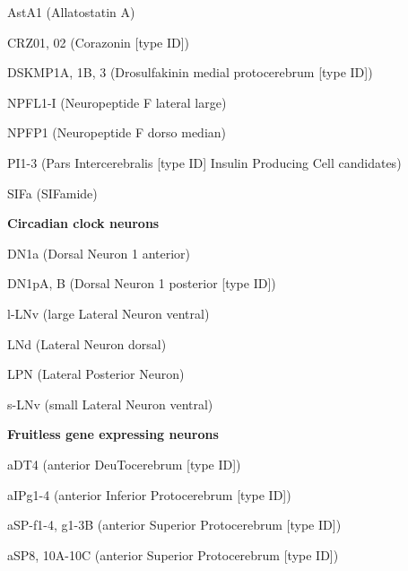 \documentclass{article}
\begin{document}
{\footnotesize
\noindent\hspace*{1.0em}AstA1 (Allatostatin A)\par
\noindent\hspace*{1.0em}CRZ01, 02 (Corazonin [type ID])\par
\noindent\hspace*{1.0em}DSKMP1A, 1B, 3 (Drosulfakinin medial protocerebrum [type ID])\par
\noindent\hspace*{1.0em}NPFL1-I (Neuropeptide F lateral large)\par
\noindent\hspace*{1.0em}NPFP1 (Neuropeptide F dorso median)\par
\noindent\hspace*{1.0em}PI1-3 (Pars Intercerebralis [type ID] Insulin Producing Cell candidates)\par
\noindent\hspace*{1.0em}SIFa (SIFamide)\par
\noindent\textbf{Circadian clock neurons}\par
\noindent\hspace*{1.0em}DN1a (Dorsal Neuron 1 anterior)\par
\noindent\hspace*{1.0em}DN1pA, B (Dorsal Neuron 1 posterior [type ID])\par
\noindent\hspace*{1.0em}l-LNv (large Lateral Neuron ventral)\par
\noindent\hspace*{1.0em}LNd (Lateral Neuron dorsal)\par
\noindent\hspace*{1.0em}LPN (Lateral Posterior Neuron)\par
\noindent\hspace*{1.0em}s-LNv (small Lateral Neuron ventral)\par
\noindent\textbf{Fruitless gene expressing neurons}\par
\noindent\hspace*{1.0em}aDT4 (anterior DeuTocerebrum [type ID])\par
\noindent\hspace*{1.0em}aIPg1-4 (anterior Inferior Protocerebrum [type ID])\par
\noindent\hspace*{1.0em}aSP-f1-4, g1-3B (anterior Superior Protocerebrum [type ID])\par
\noindent\hspace*{1.0em}aSP8, 10A-10C (anterior Superior Protocerebrum [type ID])\par
}
\end{document}
